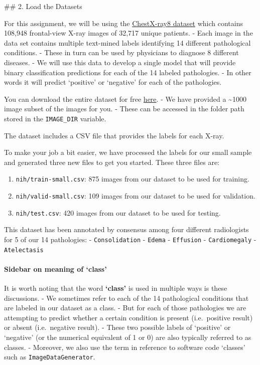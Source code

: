 \documentclass[11pt]{article}
\providecommand{\tightlist}{%
      \setlength{\itemsep}{0pt}\setlength{\parskip}{0pt}}
\begin{document}
     \#\# 2. Load the Datasets

For this assignment, we will be using the
\href{https://arxiv.org/abs/1705.02315}{ChestX-ray8 dataset} which
contains 108,948 frontal-view X-ray images of 32,717 unique patients. -
Each image in the data set contains multiple text-mined labels
identifying 14 different pathological conditions. - These in turn can be
used by physicians to diagnose 8 different diseases. - We will use this
data to develop a single model that will provide binary classification
predictions for each of the 14 labeled pathologies. - In other words it
will predict `positive' or `negative' for each of the pathologies.

You can download the entire dataset for free
\href{https://nihcc.app.box.com/v/ChestXray-NIHCC}{here}. - We have
provided a \textasciitilde{}1000 image subset of the images for you. -
These can be accessed in the folder path stored in the
\texttt{IMAGE\_DIR} variable.

The dataset includes a CSV file that provides the labels for each X-ray.

To make your job a bit easier, we have processed the labels for our
small sample and generated three new files to get you started. These
three files are:

\begin{enumerate}
\def\labelenumi{\arabic{enumi}.}
\tightlist
\item
  \texttt{nih/train-small.csv}: 875 images from our dataset to be used
  for training.
\item
  \texttt{nih/valid-small.csv}: 109 images from our dataset to be used
  for validation.
\item
  \texttt{nih/test.csv}: 420 images from our dataset to be used for
  testing.
\end{enumerate}

This dataset has been annotated by consensus among four different
radiologists for 5 of our 14 pathologies: - \texttt{Consolidation} -
\texttt{Edema} - \texttt{Effusion} - \texttt{Cardiomegaly} -
\texttt{Atelectasis}

    \hypertarget{sidebar-on-meaning-of-class}{%
\paragraph{Sidebar on meaning of
`class'}\label{sidebar-on-meaning-of-class}}

It is worth noting that the word \textbf{`class'} is used in multiple
ways is these discussions. - We sometimes refer to each of the 14
pathological conditions that are labeled in our dataset as a class. -
But for each of those pathologies we are attempting to predict whether a
certain condition is present (i.e.~positive result) or absent
(i.e.~negative result). - These two possible labels of `positive' or
`negative' (or the numerical equivalent of 1 or 0) are also typically
referred to as classes. - Moreover, we also use the term in reference to
software code `classes' such as \texttt{ImageDataGenerator}.
\end{document}
